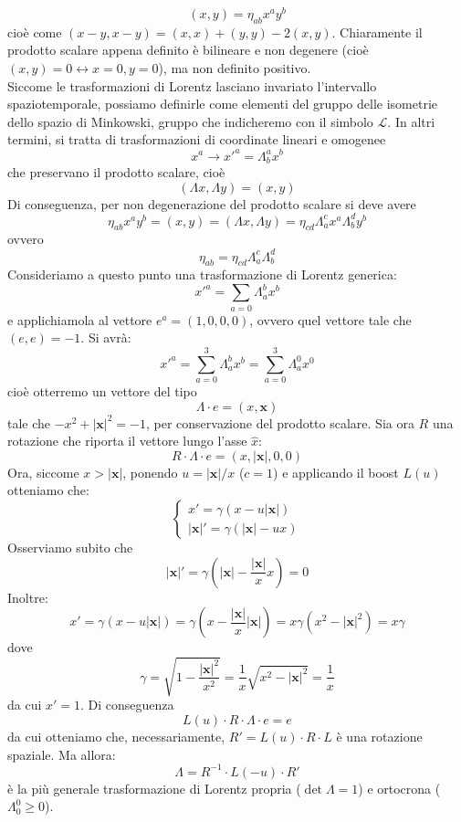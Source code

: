\documentclass[a4paper,11pt]{book}
\theoremstyle{plain}
\theoremstyle{definition}
\begin{document}
\[
(x,y)=\eta_{ab}x^ay^b
\]
cioè come $(x-y,x-y)=(x,x)+(y,y)-2(x,y)$. Chiaramente il prodotto scalare appena definito è bilineare e non degenere (cioè $(x,y)=0 \leftrightarrow x=0,y=0$), ma non definito positivo. \\
Siccome le trasformazioni di Lorentz lasciano invariato l'intervallo spaziotemporale, possiamo definirle come elementi del gruppo delle isometrie dello spazio di Minkowski, gruppo che indicheremo con il simbolo $\mathcal{L}$. In altri termini, si tratta di trasformazioni di coordinate lineari e omogenee
\[
x^a \to x'^a=\Lambda_b^ax^b
\]
che preservano il prodotto scalare, cioè
\[
(\Lambda x,\Lambda y)=(x,y)
\]
Di conseguenza, per non degenerazione del prodotto scalare si deve avere
\[
\eta_{ab}x^ay^b=(x,y)=(\Lambda x,\Lambda y)=\eta_{cd}\Lambda_a^c x^a\Lambda_b^d y^b
\]
ovvero
\[
\eta_{ab}=\eta_{cd}\Lambda_a^c \Lambda_b^d
\]
Consideriamo a questo punto una trasformazione di Lorentz generica:
\[
x'^a=\sum_{a=0}\Lambda_a^b x^b
\]
e applichiamola al vettore $e^a=(1,0,0,0)$, ovvero quel vettore tale che $(e,e)=-1$. Si avrà:
\[
x'^a = \sum_{a=0}^3\Lambda_a^b x^b=\sum_{a=0}^3 \Lambda _a ^0 x^0
\]
cioè otterremo un vettore del tipo
\[
\Lambda\cdot e = (x,\textbf{x})
\]
tale che $-x^2+|\textbf{x}|^2=-1$, per conservazione del prodotto scalare. Sia ora $R$ una rotazione che riporta il vettore lungo l'asse $\hat{x}$:
\[
R\cdot \Lambda \cdot e = (x,|\textbf{x}|,0,0)
\]
Ora, siccome $x>|\textbf{x}|$, ponendo $u=|\textbf{x}|/x$ ($c=1$) e applicando il boost $L(u)$ otteniamo che:
\[
\begin{cases}
x'=\gamma (x-u|\textbf{x}|) \\
|\textbf{x}|'=\gamma (|\textbf{x}|-ux)
\end{cases}
\]
Osserviamo subito che
\[
|\textbf{x}|'=\gamma\left(|\textbf{x}|-\frac{|\textbf{x}|}{x}x\right)=0
\]
Inoltre:
\[
x'=\gamma(x-u|\textbf{x}|)=\gamma \left( x-\frac{|\textbf{x}|}{x}|\textbf{x}| \right)=x\gamma(x^2-|\textbf{x}|^2)=x\gamma
\]
dove 
\[
\gamma = \sqrt{1-\frac{|\textbf{x}|^2}{x^2}}=\frac{1}{x}\sqrt{x^2-|\textbf{x}|^2}=\frac{1}{x}
\]
da cui $x'=1$. Di conseguenza
\[
L(u)\cdot R \cdot \Lambda \cdot e = e
\]
da cui otteniamo che, necessariamente, $R'=L(u)\cdot R \cdot L$ è una rotazione spaziale. Ma allora:
\[
\Lambda=R^{-1}\cdot L(-u) \cdot R'
\]
è la più generale trasformazione di Lorentz propria ($\det \Lambda = 1$) e ortocrona ($\Lambda_0^0 \geq 0$). 
\end{document}
